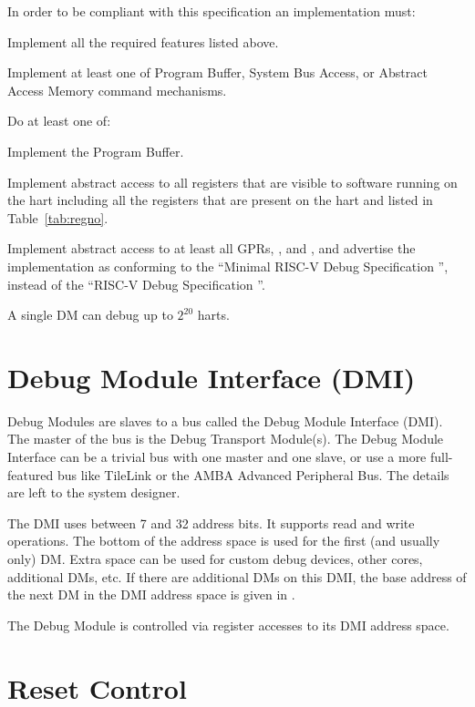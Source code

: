 \begin{steps}{In order to be compliant with this specification an
    implementation must:}
\item Implement all the required features listed above.
\item Implement at least one of Program Buffer, System Bus Access, or Abstract
    Access Memory command mechanisms.
\item
    \begin{steps}{Do at least one of:}
        \item Implement the Program Buffer.
        \item Implement abstract access to all registers that are visible to
            software running on the hart including all the registers that are
            present on the hart and listed in Table~\ref{tab:regno}.
        \item Implement abstract access to at least all GPRs, \RcsrDcsr, and
            \RcsrDpc, and advertise the implementation as conforming to the
            ``Minimal RISC-V Debug Specification \versionnum'', instead of the
            ``RISC-V Debug Specification \versionnum''.
    \end{steps}
\end{steps}

A single DM can debug up to $2^{20}$ harts.

\section{Debug Module Interface (DMI)} \label{dmi}

Debug Modules are slaves to a bus called the Debug Module Interface (DMI). The
master of the bus is the Debug Transport Module(s).
The Debug Module Interface can be a trivial bus with one master and one slave,
or use a more full-featured bus like TileLink or the AMBA Advanced Peripheral
Bus. The details are left to the system designer.

The DMI uses between 7 and 32 address bits.  It supports read and write
operations.  The bottom of the address space is
used for the first (and usually only) DM. Extra space can be used for custom
debug devices, other cores, additional DMs, etc. If there are additional DMs
on this DMI, the base address of the next DM in the DMI address space is given
in \RdmNextdm.

The Debug Module is controlled via register accesses to its DMI address space.

\section{Reset Control} \label{reset}

